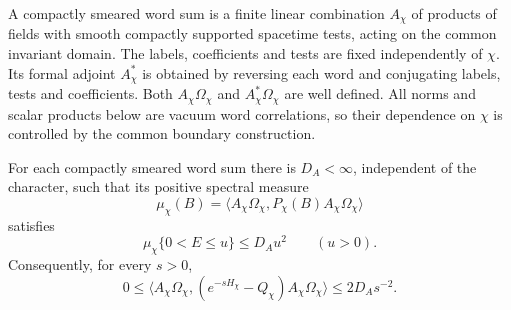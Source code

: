 A compactly smeared word sum is a finite linear combination $A_\chi$
of products of fields with smooth compactly supported spacetime tests,
acting on the common invariant domain. The labels, coefficients and tests
are fixed independently of $\chi$. Its formal adjoint $A_\chi^*$ is
obtained by reversing each word and conjugating labels, tests and
coefficients. Both $A_\chi\Omega_\chi$ and
$A_\chi^*\Omega_\chi$ are well defined. All norms and scalar products
below are vacuum word correlations, so their dependence on $\chi$ is
controlled by the common boundary construction.

\begin{lemma}
\label{lem:phase-uniform-low-energy}
For each compactly smeared word sum there is $D_A<\infty$, independent
of the character, such that its positive spectral measure
\[
 \mu_\chi(B)=\langle A_\chi\Omega_\chi,
                  P_\chi(B)A_\chi\Omega_\chi\rangle
\]
satisfies
\begin{equation}\label{eq:phase-low-energy}
 \mu_\chi\{0<E\le u\}\le D_Au^2\qquad(u>0).
\end{equation}
Consequently, for every $s>0$,
\begin{equation}\label{eq:phase-heat-remainder}
 0\le\langle A_\chi\Omega_\chi,
       (e^{-sH_\chi}-Q_\chi)A_\chi\Omega_\chi\rangle
       \le 2D_As^{-2}.
\end{equation}
\end{lemma}
